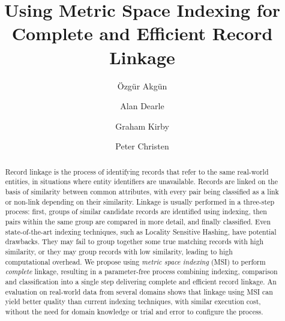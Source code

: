 \documentclass{llncs}
\begin{document}
       
\title{Using Metric Space Indexing for Complete and Efficient Record Linkage}


\author{{\"O}zg{\"u}r Akg{\"u}n \and Alan Dearle
  \and Graham Kirby \and Peter Christen}

      

\maketitle

\begin{abstract}

Record linkage is the process of identifying records that refer to the
same real-world entities, in situations where entity identifiers are
unavailable. Records are linked on the basis of similarity between
common attributes, with every pair being classified as a link or
non-link depending on their similarity. Linkage is
usually performed in a three-step process: first, groups of similar
candidate records are identified using indexing, then pairs within the same
group are compared in more detail, and finally classified.
Even state-of-the-art indexing techniques, such as Locality Sensitive
Hashing, have potential drawbacks. They may fail to group together some
true matching records with high similarity, or they may group
records with low similarity, leading to high computational overhead.
We propose using \emph{metric space indexing} (MSI) to perform \emph{complete}
linkage, resulting in a parameter-free process
combining indexing, comparison and classification into a single step
delivering complete and efficient record linkage. An
evaluation on real-world data from several domains shows that
linkage using MSI can yield better quality than
current indexing techniques, with similar execution cost, without the
need for domain knowledge or trial and error to configure the process.

\end{abstract}
\end{document}
